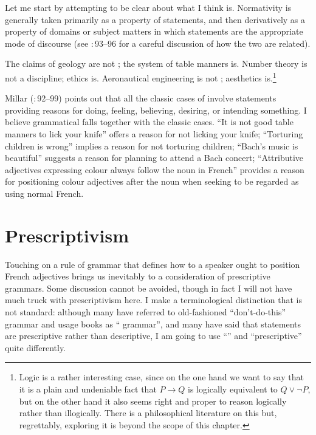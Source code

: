 \documentclass[output=paper]{langscibook}
\begin{document}
Let me start by attempting to be clear about what I think  is. Normativity is generally taken primarily as a property of statements, and then derivatively as a property of domains or subject matters in which  statements are the appropriate mode of discourse (see \citealt{Millar04}:\,93--96 for a careful discussion of how the two are related).

The claims of geology are not ; the system of table manners is. Number theory is not a  discipline; ethics is. Aeronautical engineering is not ; aesthetics is.\footnote{Logic is a rather interesting case, since on the one hand we want to say that it is a plain and undeniable fact that $P \rightarrow Q$ is logically equivalent to $Q \vee \neg P$, but on the other hand it also seems right and proper to reason logically rather than illogically. There is a philosophical literature on this but, regrettably, exploring it is  beyond the scope of this chapter.}

Millar (\citeyear{Millar04}:\,92--99) points out that all the classic cases of  involve  statements providing reasons for doing, feeling, believing, desiring, or intending something. I believe grammatical  falls together with the classic cases. ``It is not good table manners to lick your knife'' offers a reason for not licking your knife; ``Torturing children is wrong'' implies a reason for not torturing children; ``Bach's music is beautiful'' suggests a reason for planning to attend a Bach concert; ``Attributive adjectives expressing colour always follow the noun in French'' provides a reason for positioning colour adjectives after the noun when seeking to be regarded as using normal French.

\section{Prescriptivism}
\label{sec:pullum:prescriptivism}

Touching on a rule of grammar that defines how to a speaker ought to position French adjectives brings us inevitably to a consideration of prescriptive grammars. Some discussion cannot be avoided, though in fact I will not have much truck with prescriptivism here. I make a terminological distinction that is not standard: although many have referred to old-fashioned ``don't-do-this'' grammar and usage books as `` grammar'', and many have said that  statements are prescriptive rather than descriptive, I am going to use ``'' and ``prescriptive'' quite differently.
\end{document}
